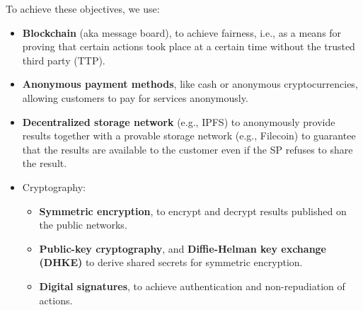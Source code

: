 To achieve these objectives, we use:
\begin{itemize}
    \item \textbf{Blockchain} (aka message board), to achieve fairness, i.e., as a means for proving that certain actions took place at a certain time without the trusted third party (TTP).
    \item \textbf{Anonymous payment methods}, like cash or anonymous cryptocurrencies, allowing customers to pay for services anonymously.
    \item \textbf{Decentralized storage network} (e.g., IPFS) to anonymously provide results together with a provable storage network (e.g., Filecoin) to guarantee that the results are available to the customer even if the SP refuses to share the result.
    
    \item Cryptography:
    \begin{itemize}
        \item \textbf{Symmetric encryption}, to encrypt and decrypt results published on the public networks.
        \item \textbf{Public-key cryptography}, and \textbf{Diffie-Helman key exchange (DHKE)} to derive shared secrets for symmetric encryption.
        \item \textbf{Digital signatures}, to achieve authentication and non-repudiation of actions. 
    \end{itemize}
    
\end{itemize}


